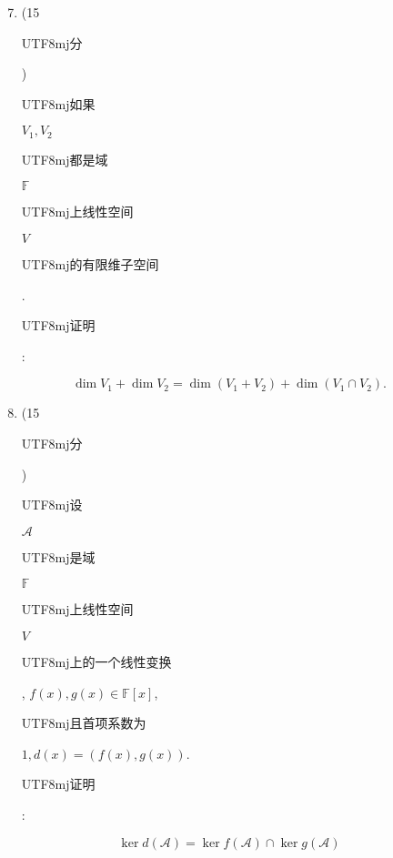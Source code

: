 \documentclass[10pt]{article}
\begin{document}
\begin{enumerate}
  \setcounter{enumi}{6}
  \item (15 \begin{CJK}{UTF8}{mj}分\end{CJK}) \begin{CJK}{UTF8}{mj}如果\end{CJK} $V_{1}, V_{2}$ \begin{CJK}{UTF8}{mj}都是域\end{CJK} $\mathbb{F}$ \begin{CJK}{UTF8}{mj}上线性空间\end{CJK} $V$ \begin{CJK}{UTF8}{mj}的有限维子空间\end{CJK}. \begin{CJK}{UTF8}{mj}证明\end{CJK}:
\end{enumerate}
$$
\operatorname{dim} V_{1}+\operatorname{dim} V_{2}=\operatorname{dim}\left(V_{1}+V_{2}\right)+\operatorname{dim}\left(V_{1} \cap V_{2}\right) .
$$

\begin{enumerate}
  \setcounter{enumi}{7}
  \item (15 \begin{CJK}{UTF8}{mj}分\end{CJK}) \begin{CJK}{UTF8}{mj}设\end{CJK} $\mathscr{A}$ \begin{CJK}{UTF8}{mj}是域\end{CJK} $\mathbb{F}$ \begin{CJK}{UTF8}{mj}上线性空间\end{CJK} $V$ \begin{CJK}{UTF8}{mj}上的一个线性变换\end{CJK}, $f(x), g(x) \in \mathbb{F}[x]$, \begin{CJK}{UTF8}{mj}且首项系数为\end{CJK} $1, d(x)=(f(x), g(x))$. \begin{CJK}{UTF8}{mj}证明\end{CJK}:
\end{enumerate}
$$
\operatorname{ker} d(\mathscr{A})=\operatorname{ker} f(\mathscr{A}) \cap \operatorname{ker} g(\mathscr{A})
$$
\end{document}
